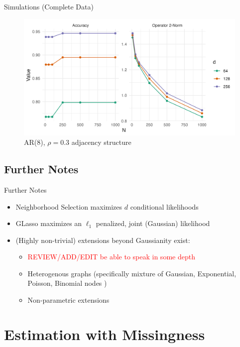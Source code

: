 \documentclass{beamer}
\begin{document}
\begin{frame}{Simulations (Complete Data)}
    \begin{figure}
        \centering 
        \includegraphics[scale=0.65]{glasso_complete_fixN_b8.png}
        \caption{AR(8), $\rho=0.3$ adjacency structure}
    \end{figure}
\end{frame}



\subsection{Further Notes}

\begin{frame}{Further Notes}
\begin{itemize}
    \item Neighborhood Selection maximizes $d$ conditional likelihoods
    \item GLasso maximizes an $\ell_1$ penalized, joint (Gaussian) likelihood
    \item (Highly non-trivial) extensions beyond Gaussianity exist:
    \begin{itemize}
        \item \textcolor{red}{ REVIEW/ADD/EDIT be able to speak in some depth} 
        \item Heterogenous graphs (specifically mixture of Gaussian, Exponential, Poisson, Binomial nodes ) \cite{chen_selection_2015} 
        \item Non-parametric extensions \cite{dong_nonparametric_2022}
    \end{itemize}
\end{itemize}    
\end{frame}


\section{Estimation with Missingness}
\end{document}
